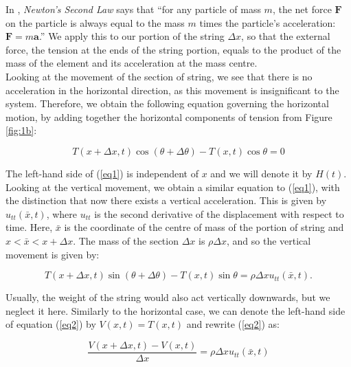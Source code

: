 \documentclass[a4paper, 12pt]{article}
\numberwithin{equation}{section}
\begin{document}
In \cite{Tay}, \emph{Newton's Second Law} says that ``for any particle of mass
$m$, the net force $\boldsymbol{F}$ on the particle is always equal to the mass
$m$ times the particle's acceleration: $\boldsymbol{F} = m \boldsymbol{a}$.''
We apply this to our portion of the string $\Delta x$, so that the external
force, the tension at the ends of the string portion, equals to the product of
the mass of the element and its acceleration at the mass centre. \\

Looking at the movement of the section of string, we see that there is no
acceleration in the horizontal direction, as this movement is insignificant to
the system. Therefore, we obtain the following equation governing the horizontal
motion, by adding together the horizontal components of tension from Figure
\ref{fig:1b}:

\begin {equation} \label{eq1}
    T(x+\Delta x,t)\cos{(\theta + \Delta \theta)}-T(x,t)\cos{\theta}=0
\end {equation}

The left-hand side of (\ref{eq1}) is independent of $x$ and we will denote it by $H(t)$.
\\

Looking at the vertical movement, we obtain a similar equation to (\ref{eq1}), with the distinction
that now there exists a vertical acceleration. This is given by $u_{tt} (\bar{x},t)$, where $u_{tt}$ is the second derivative
of the displacement with respect to time. Here,
 $\bar{x}$ is the coordinate of the centre of mass of the portion of string and $x<\bar{x}<x+\Delta x$. The mass of the 
 section $\Delta x$ is $\rho\Delta x$, and so the vertical movement is given by:

 \begin{equation} \label{eq2}
    T(x+\Delta x,t)\sin{(\theta + \Delta \theta)}-T(x,t)\sin{\theta}=\rho\Delta x u_{tt} (\bar{x},t).
 \end{equation}

 Usually, the weight of the string would also act vertically downwards, but we
 neglect it here. Similarly to the horizontal case, we can denote the left-hand
 side of equation (\ref{eq2}) by $V(x,t)=T(x,t)$ and rewrite (\ref{eq2}) as:

 \begin{equation} \label{eq3}
    \frac{V(x+\Delta x,t)-V(x,t)}{\Delta x}=\rho\Delta x u_{tt} (\bar{x},t)
 \end{equation}
\end{document}
